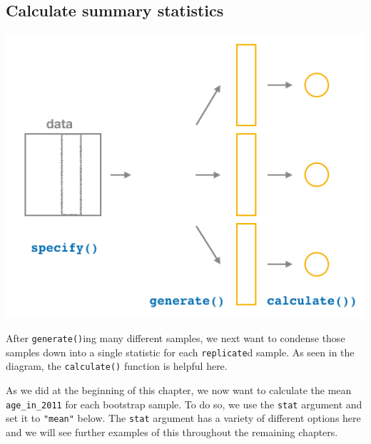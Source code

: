 \documentclass[12pt,]{krantz}
\makeatletter
\newenvironment{Shaded}{\begin{snugshade}}{\end{snugshade}}
\newcommand{\KeywordTok}[1]{\textcolor[rgb]{0.27,0.27,0.27}{\textbf{#1}}}
\newcommand{\DataTypeTok}[1]{\textcolor[rgb]{0.27,0.27,0.27}{#1}}
\newcommand{\DecValTok}[1]{\textcolor[rgb]{0.06,0.06,0.06}{#1}}
\newcommand{\StringTok}[1]{\textcolor[rgb]{0.5,0.5,0.5}{#1}}
\newcommand{\OperatorTok}[1]{\textcolor[rgb]{0.43,0.43,0.43}{\textbf{#1}}}
\newcommand{\NormalTok}[1]{#1}
\newenvironment{kframe}{%
\medskip{}
\setlength{\fboxsep}{.8em}
 \def\at@end@of@kframe{}%
 \ifinner\ifhmode%
  \def\at@end@of@kframe{\end{minipage}}%
  \begin{minipage}{\columnwidth}%
 \fi\fi%
 \def\FrameCommand##1{\hskip\@totalleftmargin \hskip-\fboxsep
 \colorbox{shadecolor}{##1}\hskip-\fboxsep
     \hskip-\linewidth \hskip-\@totalleftmargin \hskip\columnwidth}%
 \MakeFramed {\advance\hsize-\width
   \@totalleftmargin\z@ \linewidth\hsize
   \@setminipage}}%
 {\par\unskip\endMakeFramed%
 \at@end@of@kframe}
\renewenvironment{Shaded}{\begin{kframe}}{\end{kframe}}
\makeatother
\begin{document}
\subsection{Calculate summary
statistics}\label{calculate-summary-statistics}

\begin{center}\includegraphics[width=\textwidth]{images/flowcharts/infer/calculate} \end{center}

After \texttt{generate()}ing many different samples, we next want to
condense those samples down into a single statistic for each
\texttt{replicate}d sample. As seen in the diagram, the
\texttt{calculate()} function is helpful here.

As we did at the beginning of this chapter, we now want to calculate the
mean \texttt{age\_in\_2011} for each bootstrap sample. To do so, we use
the \texttt{stat} argument and set it to \texttt{"mean"} below. The
\texttt{stat} argument has a variety of different options here and we
will see further examples of this throughout the remaining chapters.

\begin{Shaded}
\end{Shaded}
\end{document}
